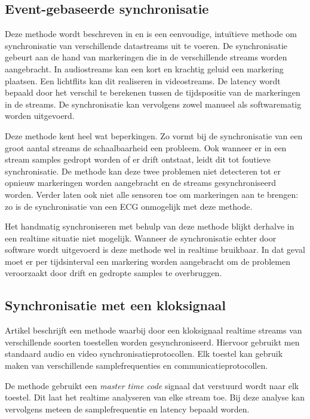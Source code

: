 \subsection{Event-gebaseerde synchronisatie}

Deze methode wordt beschreven in \cite{bannach2009automatic, six2015multimodal} en is een eenvoudige, intuïtieve methode om synchronisatie van verschillende datastreams uit te voeren. De synchronisatie gebeurt aan de hand van markeringen die in de verschillende streams worden aangebracht. In audiostreams kan een kort en krachtig geluid een markering plaatsen. Een lichtflits kan dit realiseren in videostreams. De latency wordt bepaald door het verschil te berekenen tussen de tijdspositie van de markeringen in de streams. De synchronisatie kan vervolgens zowel manueel als softwarematig worden uitgevoerd.

Deze methode kent heel wat beperkingen. Zo vormt bij de synchronisatie van een groot aantal streams de schaalbaarheid een probleem. Ook wanneer er in een stream samples gedropt worden of er drift ontstaat, leidt dit tot foutieve synchronisatie. De methode kan deze twee problemen niet detecteren tot er opnieuw markeringen worden aangebracht en de streams gesynchroniseerd worden. Verder laten ook niet alle sensoren toe om markeringen aan te brengen: zo is de synchronisatie van een ECG onmogelijk met deze methode.

Het handmatig synchroniseren met behulp van deze methode blijkt derhalve in een realtime situatie niet mogelijk.  Wanneer de synchronisatie echter door software wordt uitgevoerd is deze methode wel in realtime bruikbaar. In dat geval moet er per tijdsinterval een markering worden aangebracht om de problemen veroorzaakt door drift en gedropte samples te overbruggen.

\subsection{Synchronisatie met een kloksignaal}

Artikel \cite{jaimovich2010synchronization} beschrijft een methode waarbij door een kloksignaal realtime streams van verschillende soorten toestellen worden gesynchroniseerd. Hiervoor gebruikt men standaard audio en video synchronisatieprotocollen. Elk toestel kan gebruik maken van verschillende samplefrequenties en communicatieprotocollen.

De methode gebruikt een \textit{master time code} signaal dat verstuurd wordt naar elk toestel. Dit laat het realtime analyseren van elke stream toe. Bij deze analyse kan vervolgens meteen de samplefrequentie en latency bepaald worden. 

